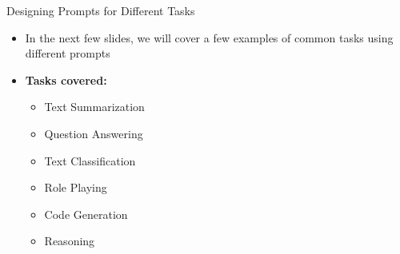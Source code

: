 \begin{frame}{Designing Prompts for Different Tasks}
  \begin{itemize}
    \item[$\blacktriangleright$] In the next few slides, we will cover a few examples of common tasks using different prompts
    \vspace{1em}
    \item[$\blacktriangleright$] \textbf{Tasks covered:}
    \begin{itemize}
      \item[$\circ$] Text Summarization
      \item[$\circ$] Question Answering
      \item[$\circ$] Text Classification
      \item[$\circ$] Role Playing
      \item[$\circ$] Code Generation
      \item[$\circ$] Reasoning
    \end{itemize}
  \end{itemize}
\end{frame}
